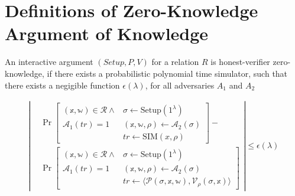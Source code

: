 
\section{Definitions of Zero-Knowledge Argument of Knowledge}\label{sec:appendix}
\begin{definition}
    An interactive argument $(Setup, P, V)$ for a relation $R$ is honest-verifier zero-knowledge, if there exists a
    probabilistic polynomial time simulator, such that there exists a negigible function $\epsilon(\lambda)$, for all adversaries $A_1$ and $A_2$

    \begin{align*}
        \left| %
        \begin{aligned} %
            & \Pr \left[ %
                \begin{array}{c|l}
                (\mathbb{x},\mathbb{w}) \in \mathcal{R} \land & \sigma \leftarrow \text{Setup}(1^\lambda) \\
                \mathcal{A}_1(tr) = 1 & (\mathbb{x},\mathbb{w},\rho) \leftarrow \mathcal{A}_2(\sigma) \\
                & tr \leftarrow \text{SIM}(x,\rho)
                \end{array}
                \right] - \\ %
            & \Pr \left[ %
                \begin{array}{c|l}
                (\mathbb{x},\mathbb{w}) \in \mathcal{R} \land & \sigma \leftarrow \text{Setup}(1^\lambda) \\
                \mathcal{A}_1(tr) = 1 & (\mathbb{x},\mathbb{w},\rho) \leftarrow \mathcal{A}_2(\sigma) \\
                & tr \leftarrow \langle \mathcal{P}(\sigma,\mathbb{x},\mathbb{w}), \mathcal{V}_\rho(\sigma,\mathbb{x}) \rangle
                \end{array}
                \right]
        \end{aligned}
        \right| %
        \leq \epsilon(\lambda)
    \end{align*}
\end{definition}

